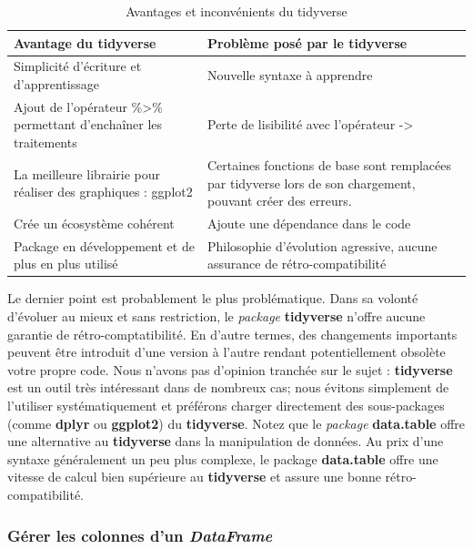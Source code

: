 \documentclass[
  11pt,
  french,
]{book}
\begin{document}
\begin{table}

\caption{\label{tab:tableTidyverse}Avantages et inconvénients du tidyverse}
\centering
\fontsize{8}{10}\selectfont
\begin{tabular}[t]{>{\raggedright\arraybackslash}p{7cm}>{\raggedright\arraybackslash}p{7cm}}
\toprule
Avantage du tidyverse & Problème posé par le tidyverse\\
\midrule
Simplicité d'écriture et d'apprentissage & Nouvelle syntaxe à apprendre\\
Ajout de l'opérateur \%>\% permettant d'enchaîner les traitements & Perte de lisibilité avec l'opérateur ->\\
La meilleure librairie pour réaliser des graphiques : ggplot2 & Certaines fonctions de base sont remplacées par tidyverse lors de son chargement, pouvant créer des erreurs.\\
Crée un écosystème cohérent & Ajoute une dépendance dans le code\\
Package en développement et de plus en plus utilisé & Philosophie d'évolution agressive, aucune assurance de rétro-compatibilité\\
\bottomrule
\end{tabular}
\end{table}

Le dernier point est probablement le plus problématique. Dans sa volonté d'évoluer au mieux et sans restriction, le \emph{package} \textbf{tidyverse} n'offre aucune garantie de rétro-comptatibilité. En d'autre termes, des changements importants peuvent être introduit d'une version à l'autre rendant potentiellement obsolète votre propre code. Nous n'avons pas d'opinion tranchée sur le sujet : \textbf{tidyverse} est un outil très intéressant dans de nombreux cas; nous évitons simplement de l'utiliser systématiquement et préférons charger directement des sous-packages (comme \textbf{dplyr} ou \textbf{ggplot2}) du \textbf{tidyverse}. Notez que le \emph{package} \textbf{data.table} offre une alternative au \textbf{tidyverse} dans la manipulation de données. Au prix d'une syntaxe généralement un peu plus complexe, le package \textbf{data.table} offre une vitesse de calcul bien supérieure au \textbf{tidyverse} et assure une bonne rétro-compatibilité.

\hypertarget{sect01422}{%
\subsubsection{\texorpdfstring{Gérer les colonnes d'un \emph{DataFrame}}{Gérer les colonnes d'un DataFrame}}\label{sect01422}}
\end{document}
